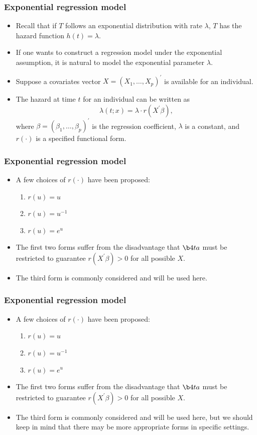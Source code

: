 \documentclass[10pt]{beamer}\usepackage[]{graphicx}\usepackage[]{color}
\begin{document}
\begin{frame}
  \frametitle{Exponential regression model}
  \begin{itemize}
  \item Recall that if $T$ follows an exponential distribution with rate $\lambda$,
    $T$ has the hazard function $h(t) = \lambda$.
  \item If one wants to construct a regression model under the exponential assumption,
    it is natural to model the exponential parameter $\lambda$.
  \item Suppose a covariates vector $X = (X_{1}, \ldots, X_{p})^\prime$ is available for an individual.
  \item The hazard at time $t$ for an individual can be written as
    $$\lambda(t; x) = \lambda \cdot r(X^\prime\beta),$$
    where $\beta = (\beta_1, \ldots, \beta_p)^\prime$ is the regression coefficient,
    $\lambda$ is a constant, and $r(\cdot)$ is a specified functional form.
  \end{itemize}
\end{frame}


\begin{frame}
  \frametitle{Exponential regression model}
  \begin{itemize}
  \item A few choices of $r(\cdot)$ have been proposed:
    \begin{enumerate}
    \item $r(u) = u$
    \item $r(u) = u^{-1}$
    \item $r(u) = e^u$
    \end{enumerate}
  \item The first two forms suffer from the disadvantage that $\b4ta$ must be restricted
    to guarantee $r(X^\prime\beta) > 0$ for all possible $X$.
  \item The third form is commonly considered and will be used here.
  \end{itemize}
\end{frame}

\begin{frame}
  \frametitle{Exponential regression model}
  \begin{itemize}
  \item A few choices of $r(\cdot)$ have been proposed:
    \begin{enumerate}
    \item $r(u) = u$
    \item $r(u) = u^{-1}$
    \item $r(u) = e^u$
    \end{enumerate}
  \item The first two forms suffer from the disadvantage that $\b4ta$ must be restricted
    to guarantee $r(X^\prime\beta) > 0$ for all possible $X$.
  \item The third form is commonly considered and will be used here,
    but we should keep in mind that there may be more appropriate forms in specific settings.
  \end{itemize}
\end{frame}
\end{document}
